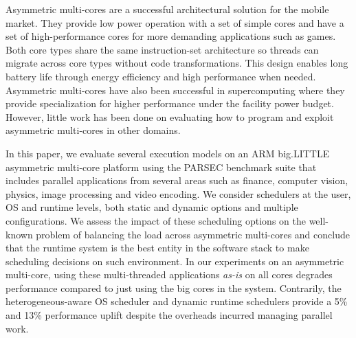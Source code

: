 Asymmetric multi-cores are a successful architectural solution for the mobile 
market. They provide low power operation with a set of simple  
cores and have a set of high-performance cores for more demanding applications 
such as games. Both core types share the same instruction-set architecture so 
threads can migrate across core types without code transformations. This design 
enables long battery life through energy efficiency and high performance when 
needed. Asymmetric multi-cores have also been successful in supercomputing where
they provide specialization for higher performance under the facility power budget. 
However, little work has been done on evaluating how to program and exploit 
asymmetric multi-cores in other domains. 

In this paper, we evaluate several execution models on an ARM 
big.LITTLE asymmetric multi-core platform using the PARSEC benchmark suite that 
includes parallel applications from several areas such as finance, computer 
vision, physics, image processing and video encoding. We consider schedulers at 
the user, OS and runtime levels, both static and dynamic options and multiple 
configurations. We assess the impact of these scheduling options on the 
well-known problem of balancing the load across asymmetric multi-cores and 
conclude that the runtime system is the best entity in the software stack to 
make scheduling decisions on such environment. In our experiments on an 
asymmetric multi-core, using these multi-threaded applications \textit{as-is} on all
cores degrades performance compared to just using the big cores in the system.  
Contrarily, the heterogeneous-aware OS scheduler and dynamic 
runtime schedulers provide a 5\% and 13\% performance uplift despite the 
overheads incurred managing parallel work.



